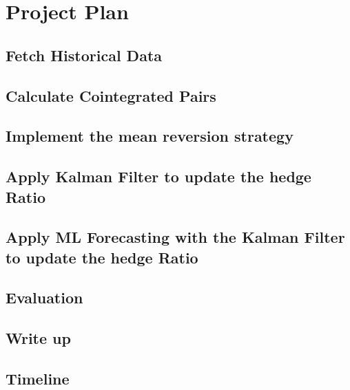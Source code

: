 \chapter{Project Plan}

\section{Fetch Historical Data}
\section{Calculate Cointegrated Pairs}
\section{Implement the mean reversion strategy}
\section{Apply Kalman Filter to update the hedge Ratio}
\section{Apply ML Forecasting with the Kalman Filter to update the hedge Ratio}
\section{Evaluation}
\section{Write up}
\section{Timeline}

